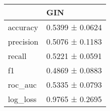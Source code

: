 \begin{tabular}{ll}
\toprule
 & GIN \\
\midrule
accuracy & 0.5399 ± 0.0624 \\
precision & 0.5076 ± 0.1183 \\
recall & 0.5221 ± 0.0591 \\
f1 & 0.4869 ± 0.0883 \\
roc_auc & 0.5335 ± 0.0793 \\
log_loss & 0.9765 ± 0.2695 \\
\bottomrule
\end{tabular}
